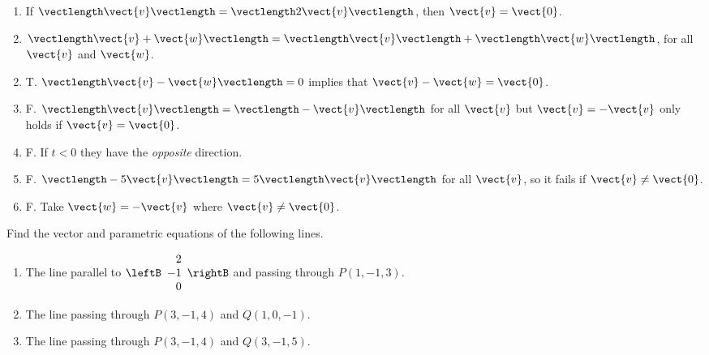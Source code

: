 \begin{multicols}{2}
\begin{ex}
\begin{enumerate}[label={\alph*.}]
\item If $\vectlength\vect{v}\vectlength = \vectlength 2\vect{v}\vectlength$, then $\vect{v} = \vect{0}$.

\item $\vectlength\vect{v} + \vect{w}\vectlength = \vectlength\vect{v}\vectlength + \vectlength\vect{w}\vectlength$, for all $\vect{v}$ and $\vect{w}$.

\end{enumerate}
\begin{sol}
\begin{enumerate}[label={\alph*.}]
\setcounter{enumi}{1}
\item  T. $\vectlength\vect{v} - \vect{w}\vectlength = 0$ implies that $\vect{v} - \vect{w} = \vect{0}$.

\setcounter{enumi}{3}
\item  F. $\vectlength\vect{v}\vectlength = \vectlength - \vect{v}\vectlength$ for all $\vect{v}$ but $\vect{v} = -\vect{v}$ only holds if $\vect{v} = \vect{0}$.

\setcounter{enumi}{5}
\item  F. If $t < 0$ they have the \textit{opposite} direction.

\setcounter{enumi}{7}
\item  F. $\vectlength -5\vect{v}\vectlength = 5\vectlength\vect{v}\vectlength$ for all $\vect{v}$, so it fails if $\vect{v} \neq \vect{0}$.

\setcounter{enumi}{9}
\item  F. Take $\vect{w} = -\vect{v}$ where $\vect{v} \neq \vect{0}$.

\end{enumerate}
\end{sol}
\end{ex}

\begin{ex}
Find the vector and parametric equations of the following lines.


\begin{enumerate}[label={\alph*.}]
\item The line parallel to 
$\leftB
\begin{array}{r}
2\\
-1\\
0
\end{array}
\rightB$
 and passing through $P(1, -1, 3)$.

\item The line passing through $P(3, -1, 4)$ and $Q(1, 0, -1)$.

\item The line passing through $P(3, -1, 4)$ and $Q(3, -1, 5)$.


\end{enumerate}
\end{ex}
\end{multicols}
